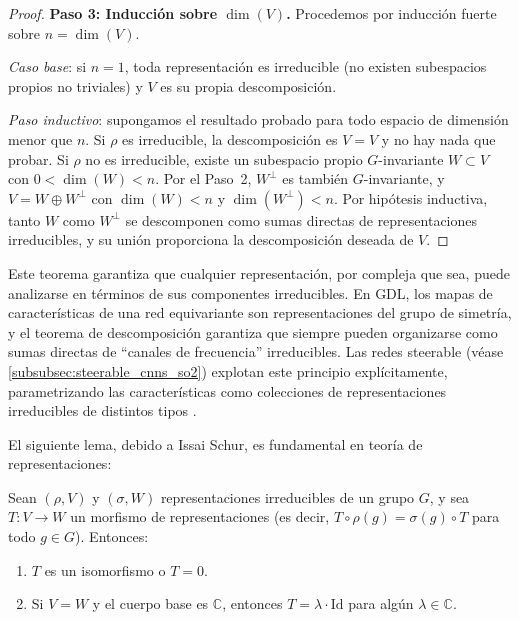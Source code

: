 \begin{proof}
\textbf{Paso 3: Inducción sobre $\dim(V)$.}
Procedemos por inducción fuerte sobre $n = \dim(V)$.

\textit{Caso base}: si $n = 1$, toda representación es irreducible (no existen subespacios propios no triviales) y $V$ es su propia descomposición.

\textit{Paso inductivo}: supongamos el resultado probado para todo espacio de dimensión menor que $n$. Si $\rho$ es irreducible, la descomposición es $V = V$ y no hay nada que probar. Si $\rho$ no es irreducible, existe un subespacio propio $G$-invariante $W \subset V$ con $0 < \dim(W) < n$. Por el Paso~2, $W^\perp$ es también $G$-invariante, y $V = W \oplus W^\perp$ con $\dim(W) < n$ y $\dim(W^\perp) < n$. Por hipótesis inductiva, tanto $W$ como $W^\perp$ se descomponen como sumas directas de representaciones irreducibles, y su unión proporciona la descomposición deseada de $V$.
\end{proof}

Este teorema garantiza que cualquier representación, por compleja que sea, puede analizarse en términos de sus componentes irreducibles. En \gls{GDL}, los mapas de características de una red equivariante son representaciones del grupo de simetría, y el teorema de descomposición garantiza que siempre pueden organizarse como sumas directas de ``canales de frecuencia'' irreducibles. Las redes steerable (véase \autoref{subsubsec:steerable_cnns_so2}) explotan este principio explícitamente, parametrizando las características como colecciones de representaciones irreducibles de distintos tipos \citep{weiler2018learningsteerable, cohen2016steerablecnns}.

El siguiente lema, debido a Issai Schur, es fundamental en teoría de representaciones:

\begin{lemma}[Schur]\label{lem:schur}
Sean $(\rho, V)$ y $(\sigma, W)$ representaciones irreducibles de un grupo $G$, y sea $T: V \to W$ un morfismo de representaciones (es decir, $T \circ \rho(g) = \sigma(g) \circ T$ para todo $g \in G$). Entonces:
\begin{enumerate}
    \item $T$ es un isomorfismo o $T = 0$.
    \item Si $V = W$ y el cuerpo base es $\mathbb{C}$, entonces $T = \lambda \cdot \mathrm{Id}$ para algún $\lambda \in \mathbb{C}$.
\end{enumerate}
\end{lemma}

